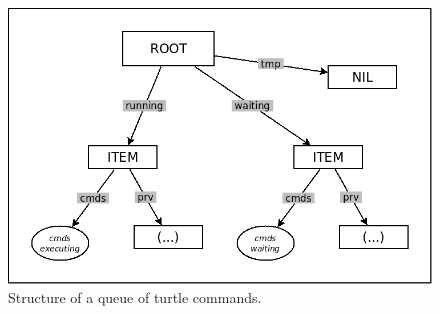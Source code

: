 \documentclass{acm_proc_article-sp}
\begin{document}
\begin{figure}%
\centering
\includegraphics[scale=0.25]{queue-1.png}
\caption{
Structure of a queue of turtle commands.
\label{fig.queue-1}
}
\end{figure}
\end{document}
